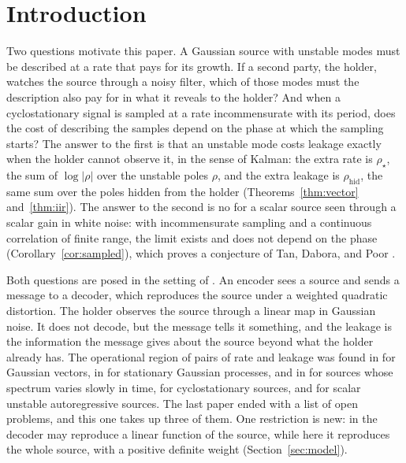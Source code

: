 \documentclass[11pt,onecolumn]{IEEEtran}
\newcommand{\rhid}{\rho_{\mathrm{hid}}}
\begin{document}
\section{Introduction}
\label{sec:intro}

Two questions motivate this paper. A Gaussian source with unstable
modes must be described at a rate that pays for its growth. If a second
party, the holder, watches the source through a noisy filter, which of
those modes must the description also pay for in what it reveals to
the holder? And when a cyclostationary signal is sampled at a rate
incommensurate with its period, does the cost of describing the samples
depend on the phase at which the sampling starts? The answer to the
first is that an unstable mode costs leakage exactly when the holder
cannot observe it, in the sense of Kalman: the extra rate is
$\rho_\star$, the sum of $\log|\rho|$ over the unstable poles $\rho$, and
the extra leakage is $\rhid$, the same sum over the poles hidden from the
holder (Theorems~\ref{thm:vector} and~\ref{thm:iir}). The answer to the
second is no for a scalar source seen through a scalar gain in white
noise: with incommensurate sampling and a continuous correlation of
finite range, the limit exists and does not depend on the phase
(Corollary~\ref{cor:sampled}), which proves a
conjecture of Tan, Dabora, and Poor \cite{tan2024}.

Both questions are posed in the setting of \cite{part1,part2,part3}. An
encoder sees a source and sends a message to a decoder, which reproduces
the source under a weighted quadratic distortion. The holder observes
the source through a linear map in Gaussian noise. It does not decode,
but the message tells it something, and the leakage is the information
the message gives about the source beyond what the holder already has.
The operational region of pairs of rate and leakage was found in
\cite{part1} for Gaussian vectors, in \cite{part2} for stationary
Gaussian processes, and in \cite{part3} for sources whose spectrum varies
slowly in time, for cyclostationary sources, and for scalar unstable
autoregressive sources. The last paper ended with a list of open
problems, and this one takes up three of them. One restriction is new:
in \cite{part1,part2,part3} the decoder may reproduce a linear function
of the source, while here it reproduces the whole source, with a
positive definite weight (Section~\ref{sec:model}).
\end{document}
